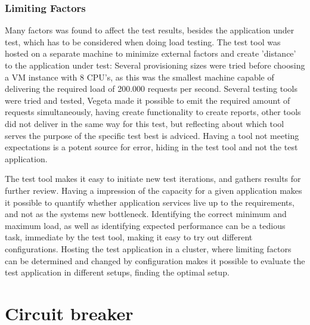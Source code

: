 \subsubsection{Limiting Factors}
Many factors was found to affect the test results, besides the application under test, which has to be considered when doing load testing. The test tool was hosted on a separate machine to minimize external factors and create 'distance' to the application under test: Several provisioning sizes were tried before choosing a VM instance with 8 CPU's, as this was the smallest machine capable of delivering the required load of 200.000 requests per second. Several testing tools were tried and tested, Vegeta made it possible to emit the required amount of requests simultaneously, having create functionality to create reports, other tools did not deliver in the same way for this test, but reflecting about which tool serves the purpose of the specific test best is adviced. Having a tool not meeting expectations is a potent source for error, hiding in the test tool and not the test application.

The test tool makes it easy to initiate new test iterations, and gathers results for further review. Having a impression of the capacity for a given application makes it possible to quantify whether application services live up to the requirements, and not as the systems new bottleneck. Identifying the correct minimum and maximum load, as well as identifying expected performance can be a tedious task, immediate by the test tool, making it easy to try out different configurations. Hosting the test application in a cluster, where limiting factors can be determined and changed by configuration makes it possible to evaluate the test application in different setups, finding the optimal setup.

\section{Circuit breaker}



